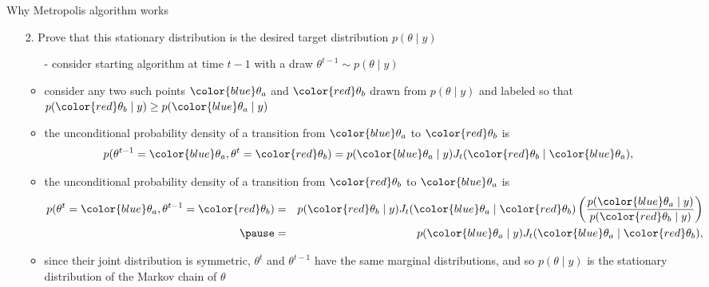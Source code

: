 \documentclass[finnish,english,t]{beamer}
\begin{document}
\begin{frame}{Why Metropolis algorithm works}

  \begin{itemize}
  \item[2.] Prove that this stationary distribution is the desired target distribution $p(\theta \mid y)$
    \begin{itemize}
    \item[-] consider starting algorithm at time $t-1$ with a draw
      $\theta^{t-1} \sim p(\theta \mid y)$ 
    \item<2->[-] consider any two such points ${\color{blue} \theta_a}$ and ${\color{red} \theta_b}$ drawn
      from $p(\theta \mid y)$ and labeled so that
      $p({\color{red} \theta_b} \mid y)\geq p({\color{blue} \theta_a} \mid y)$
    \item<3->[-] the unconditional probability density of a transition from ${\color{blue} \theta_a}$ to ${\color{red} \theta_b}$ is
      \vspace{-0.5\baselineskip}
      \begin{equation*}
        p(\theta^{t-1}={\color{blue} \theta_a},\theta^{t}={\color{red} \theta_b})=
        p({\color{blue} \theta_a} \mid y)J_t({\color{red} \theta_b} \mid {\color{blue} \theta_a}),
      \end{equation*}
      \vspace{-1\baselineskip}
    \item<4->[-] the unconditional probability density of a transition from ${\color{red} \theta_b}$ to ${\color{blue} \theta_a}$ is
      \vspace{-0.5\baselineskip}
      \begin{eqnarray*}
        p(\theta^{t}={\color{blue} \theta_a},\theta^{t-1}={\color{red} \theta_b}) & = &
        p({\color{red} \theta_b} \mid y)J_t({\color{blue} \theta_a} \mid {\color{red} \theta_b})\left(\frac{p({\color{blue} \theta_a} \mid y)}{p({\color{red} \theta_b} \mid y)}\right)\\
        \pause &  = &  p({\color{blue} \theta_a} \mid y)J_t({\color{blue} \theta_a} \mid {\color{red} \theta_b}),
      \end{eqnarray*}
      \pause
    \item<6->[-] since their joint distribution is symmetric, $\theta^t$ and
      $\theta^{t-1}$ have the same marginal distributions, and so
      $p(\theta \mid y)$ is the stationary distribution of the Markov chain of $\theta$
    \end{itemize}
  \end{itemize}

\end{frame}
\end{document}
